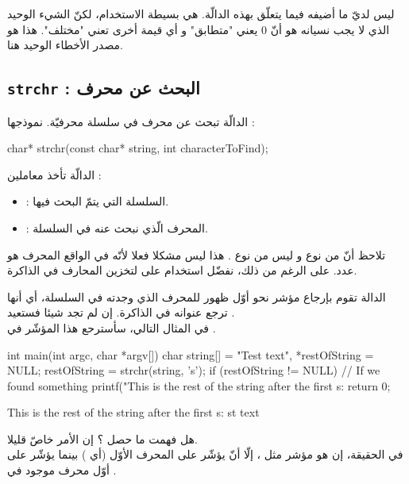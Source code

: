 ليس لديّ ما أضيفه فيما يتعلّق بهذه الدالّة. هي بسيطة الاستخدام، لكنّ الشيء الوحيد الذي لا يجب نسيانه هو أنّ 0 يعني "متطابق" و أي قيمة أخرى تعني "مختلف". هذا هو مصدر الأخطاء الوحيد هنا.

\subsection{\texttt{strchr} : البحث عن محرف}

الدالّة
تبحث عن محرف في سلسلة محرفيّة. نموذجها :

\begin{Csource}
char* strchr(const char* string, int characterToFind);
\end{Csource}

الدالّة تأخذ معاملين :

\begin{itemize}
  \item {} : السلسلة التي يتمّ البحث فيها.
  \item {} : المحرف الّذي نبحث عنه في السلسلة.
\end{itemize}

\begin{information}
  تلاحظ أنّ
  من نوع
  و ليس من نوع
  .
  هذا ليس مشكلا فعلا لأنّه في الواقع المحرف هو عدد. على الرغم من ذلك، نفضّل استخدام
  على
  لتخزين المحارف في الذاكرة.
\end{information}

الدالة تقوم بإرجاع مؤشر نحو أوّل ظهور للمحرف الذي وجدته في السلسلة، أي أنها ترجع عنوانه في الذاكرة. إن لم تجد شيئا فستعيد
.\\
في المثال التالي، سأسترحع هذا المؤشّر في
.

\begin{Csource}
int main(int argc, char *argv[])
{
	char string[] = "Test text", *restOfString = NULL;
	restOfString = strchr(string, 's');
	if (restOfString != NULL) // If we found something
	{
    		printf("This is the rest of the string after the first s:%
	 }
  return 0;
}
\end{Csource}

\begin{Console}
This is the rest of the string after the first s: st text
\end{Console}

هل فهمت ما حصل ؟ إن الأمر خاصّ قليلا.\\
في الحقيقة، إن
هو مؤشر مثل
،
إلّا أنّ
يؤشّر على المحرف الأوّل
(أي )
بينما
يؤشّر على أوّل محرف
موجود في
.

